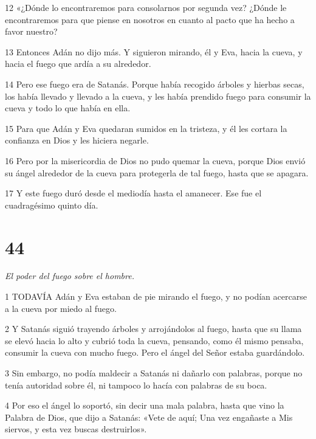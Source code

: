 \par 12 «¿Dónde lo encontraremos para consolarnos por segunda vez? ¿Dónde le encontraremos para que piense en nosotros en cuanto al pacto que ha hecho a favor nuestro?

\par 13 Entonces Adán no dijo más. Y siguieron mirando, él y Eva, hacia la cueva, y hacia el fuego que ardía a su alrededor.

\par 14 Pero ese fuego era de Satanás. Porque había recogido árboles y hierbas secas, los había llevado y llevado a la cueva, y les había prendido fuego para consumir la cueva y todo lo que había en ella.

\par 15 Para que Adán y Eva quedaran sumidos en la tristeza, y él les cortara la confianza en Dios y les hiciera negarle.

\par 16 Pero por la misericordia de Dios no pudo quemar la cueva, porque Dios envió su ángel alrededor de la cueva para protegerla de tal fuego, hasta que se apagara.

\par 17 Y este fuego duró desde el mediodía hasta el amanecer. Ese fue el cuadragésimo quinto día.

\chapter{44}

\par \textit{El poder del fuego sobre el hombre.}

\par 1 TODAVÍA Adán y Eva estaban de pie mirando el fuego, y no podían acercarse a la cueva por miedo al fuego.

\par 2 Y Satanás siguió trayendo árboles y arrojándolos al fuego, hasta que su llama se elevó hacia lo alto y cubrió toda la cueva, pensando, como él mismo pensaba, consumir la cueva con mucho fuego. Pero el ángel del Señor estaba guardándolo.

\par 3 Sin embargo, no podía maldecir a Satanás ni dañarlo con palabras, porque no tenía autoridad sobre él, ni tampoco lo hacía con palabras de su boca.

\par 4 Por eso el ángel lo soportó, sin decir una mala palabra, hasta que vino la Palabra de Dios, que dijo a Satanás: «Vete de aquí; Una vez engañaste a Mis siervos, y esta vez buscas destruirlos».

